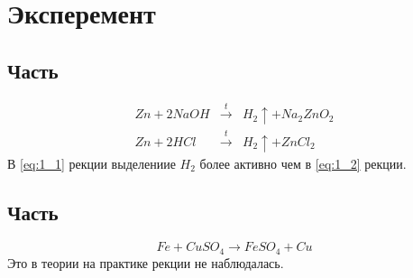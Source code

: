 \section{Эксперемент}

\subsection{Часть}

\begin{eqnarray} 
  Zn + 2NaOH &\xrightarrow{t}& H_2\uparrow + Na_2ZnO_2 
  \label{eq:1_1}\\
  Zn + 2HCl &\xrightarrow{t}& H_2\uparrow + ZnCl_2 
  \label{eq:1_2}
\end{eqnarray} 
В \ref{eq:1_1}{ рекции} выделениие $H_2$ более активно чем в
\ref{eq:1_2}{ рекции}.

\subsection{Часть}

\begin{equation} 
 Fe + CuSO_4 \xrightarrow{} FeSO_4 + Cu
\end{equation} 
Это в теории на практике рекции не наблюдалась.



